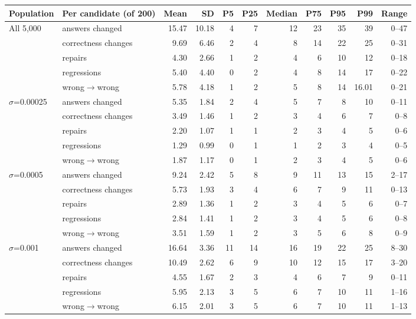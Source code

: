 \begin{table}[t]
\centering
\small
\begin{adjustbox}{max width=\linewidth}
\begin{tabular}{llrrrrrrrrr}
\toprule
Population & Per candidate (of 200) & Mean & SD & P5 & P25 & Median & P75 & P95 & P99 & Range \\
\midrule
All 5,000 & answers changed & 15.47 & 10.18 & 4 & 7 & 12 & 23 & 35 & 39 & 0--47 \\
 & correctness changes & 9.69 & 6.46 & 2 & 4 & 8 & 14 & 22 & 25 & 0--31 \\
 & repairs & 4.30 & 2.66 & 1 & 2 & 4 & 6 & 10 & 12 & 0--18 \\
 & regressions & 5.40 & 4.40 & 0 & 2 & 4 & 8 & 14 & 17 & 0--22 \\
 & wrong$\to$wrong & 5.78 & 4.18 & 1 & 2 & 5 & 8 & 14 & 16.01 & 0--21 \\
\midrule
$\sigma$=0.00025 & answers changed & 5.35 & 1.84 & 2 & 4 & 5 & 7 & 8 & 10 & 0--11 \\
 & correctness changes & 3.49 & 1.46 & 1 & 2 & 3 & 4 & 6 & 7 & 0--8 \\
 & repairs & 2.20 & 1.07 & 1 & 1 & 2 & 3 & 4 & 5 & 0--6 \\
 & regressions & 1.29 & 0.99 & 0 & 1 & 1 & 2 & 3 & 4 & 0--5 \\
 & wrong$\to$wrong & 1.87 & 1.17 & 0 & 1 & 2 & 3 & 4 & 5 & 0--6 \\
\midrule
$\sigma$=0.0005 & answers changed & 9.24 & 2.42 & 5 & 8 & 9 & 11 & 13 & 15 & 2--17 \\
 & correctness changes & 5.73 & 1.93 & 3 & 4 & 6 & 7 & 9 & 11 & 0--13 \\
 & repairs & 2.89 & 1.36 & 1 & 2 & 3 & 4 & 5 & 6 & 0--7 \\
 & regressions & 2.84 & 1.41 & 1 & 2 & 3 & 4 & 5 & 6 & 0--8 \\
 & wrong$\to$wrong & 3.51 & 1.59 & 1 & 2 & 3 & 5 & 6 & 8 & 0--9 \\
\midrule
$\sigma$=0.001 & answers changed & 16.64 & 3.36 & 11 & 14 & 16 & 19 & 22 & 25 & 8--30 \\
 & correctness changes & 10.49 & 2.62 & 6 & 9 & 10 & 12 & 15 & 17 & 3--20 \\
 & repairs & 4.55 & 1.67 & 2 & 3 & 4 & 6 & 7 & 9 & 0--11 \\
 & regressions & 5.95 & 2.13 & 3 & 5 & 6 & 7 & 10 & 11 & 1--16 \\
 & wrong$\to$wrong & 6.15 & 2.01 & 3 & 5 & 6 & 7 & 10 & 11 & 1--13 \\

\end{tabular}
\end{adjustbox}
\end{table}
